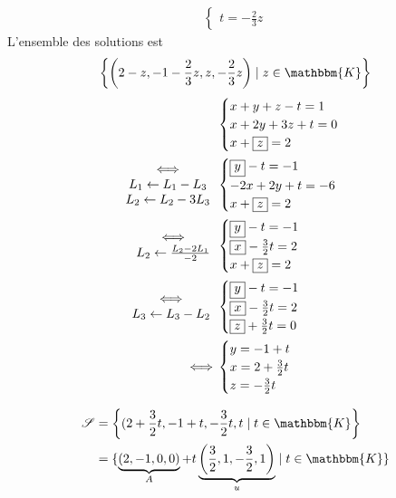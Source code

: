 \begin{exm}
\begin{align*}
\begin{cases}
			t = -\frac{2}{3}z
		\end{cases}
	\end{align*}
	L'ensemble des solutions est 
	\[
		\left\{ \left( 2-z, -1-\frac{2}{3}z, z, -\frac{2}{3}z \right) \mid z \in \mathbbm{K} \right\} 
	\] 
	\begin{align*}
		&\begin{cases}
			x + y + z - t = 1\\
			x + 2y + 3z + t = 0\\
			x + \boxed{z} = 2
		\end{cases}\\
		\begin{array}{c}
			\iff\\
			L_1 \leftarrow L_1 - L_3\\
			L_2 \leftarrow L_2 - 3L_3\\
		\end{array}&
		\begin{cases}
			\boxed{y} - t = -1\\
			-2x + 2y +t = -6\\
			x + \boxed{z} = 2
		\end{cases}\\
		\begin{array}{c}
			\iff\\
			L_2 \leftarrow \frac{L_2 - 2L_1}{-2}
		\end{array}&
		\begin{cases}
			\boxed{y} - t = -1\\
			\boxed{x} - \frac{3}{2}t = 2\\
			x + \boxed{z} = 2
		\end{cases}\\
		\begin{array}{c}
			\iff \\
			L_3 \leftarrow L_3 - L_2
		\end{array}&
		\begin{cases}
			\boxed{y} - t = -1\\
			\boxed{x} - \frac{3}{2}t = 2\\
			\boxed{z} + \frac{3}{2}t = 0
		\end{cases}\\
		\iff&
		\begin{cases}
			y = -1+t\\
			x = 2 + \frac{3}{2}t\\
			z = -\frac{3}{2}t
		\end{cases}
	\end{align*}

	\begin{align*}
		\mathcal{S} &= \left\{(2+\frac{3}{2}t, -1+t, -\frac{3}{2}t, t \mid  t \in \mathbbm{K}\right\}  \\
		&= \{\underbrace{(2, -1, 0, 0)}_{A} + t\underbrace{\left( \frac{3}{2}, 1, -\frac{3}{2}, 1 \right)}_{u}  \mid  t \in \mathbbm{K}\}  \\
	\end{align*}
\end{exm}

